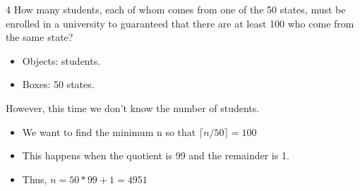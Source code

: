 \documentclass[12pt, letterpaper]{article}
\newcommand{\exheader}[1][ex]{{\tiny{#1}\normalsize}}
\newcommand{\ceil}[1]{\lceil {#1} \rceil}
\begin{document}
\exheader[4] How many students, each of whom comes from one of the 50 states, must be enrolled in a university to guaranteed that there are at least 100 who come from the same state?
\begin{itemize}[leftmargin=*, label={}]
	\item Objects: students.
	\item Boxes: 50 states.
\end{itemize}
However, this time we don't know the number of students.
\begin{itemize}[label={\faAngleRight}]
	\item We want to find the minimum n so that $\ceil{n/50} = 100$
	\item This happens when the quotient is 99 and the remainder is 1.
	\item Thus, $ n = 50 * 99 + 1 = 4951$
\end{itemize}

\pagebreak
\end{document}
